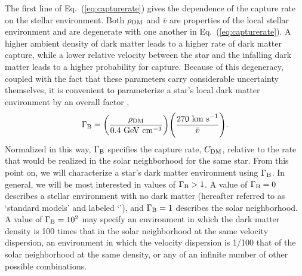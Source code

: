 \documentclass[useAMS,usenatbib]{mnras}
\providecommand{\DIFdelbegin}{} %
\providecommand{\DIFdelend}{} %
\newcommand{\DIFscaledelfig}{0.5}
\newlength{\DIFdelgraphicswidth} %
\newlength{\DIFdelgraphicsheight} %
\newcommand{\DIFdelincludegraphics}[2][]{%
\sbox{\DIFdelgraphicsbox}{\DIFOincludegraphics[#1]{#2}}%
\settoboxwidth{\DIFdelgraphicswidth}{\DIFdelgraphicsbox} %
\settoboxtotalheight{\DIFdelgraphicsheight}{\DIFdelgraphicsbox} %
\scalebox{\DIFscaledelfig}{%
\parbox[b]{\DIFdelgraphicswidth}{\usebox{\DIFdelgraphicsbox}\\[-\baselineskip] \rule{\DIFdelgraphicswidth}{0em}}\llap{\resizebox{\DIFdelgraphicswidth}{\DIFdelgraphicsheight}{%
\setlength{\unitlength}{\DIFdelgraphicswidth}%
\begin{picture}(1,1)%
\thicklines\linethickness{2pt} %
{\color[rgb]{1,0,0}\put(0,0){\framebox(1,1){}}}%
{\color[rgb]{1,0,0}\put(0,0){\line( 1,1){1}}}%
{\color[rgb]{1,0,0}\put(0,1){\line(1,-1){1}}}%
\end{picture}%
}\hspace*{3pt}}} %
} %
\DeclareRobustCommand{\DIFdelbegin}{\DIFOdelbegin \let\includegraphics\DIFdelincludegraphics} %
\DeclareRobustCommand{\DIFdelend}{\DIFOaddend \let\includegraphics\DIFOincludegraphics} %
\begin{document}
  The first line of Eq.~(\ref{eq:capturerate}) gives 
  the dependence of the capture rate on the stellar environment. 
  Both $\rho_{\mathrm{DM}}$ and $\bar{v}$ are properties of the local stellar environment 
  and are degenerate with one another in Eq.~(\ref{eq:capturerate}). 
  A higher ambient density of dark matter leads to a higher rate of dark matter capture, 
  while a lower relative velocity between the star and the infalling dark matter leads 
  to a higher probability for capture. 
  Because of this degeneracy, coupled with the fact that these parameters carry 
  considerable uncertainty themselves, 
  it is convenient to parameterize a star's 
  local dark matter environment by an overall 
  factor \citep{Zentner2011AsymmetricDwarfs,Hurst2015},
%
  \begin{equation}
  \Gamma_\mathrm{B} = \bigg(\frac{\rho_{\mathrm{DM}}}{0.4 \ \mathrm{GeV} \ \mathrm{cm}^{-3}}\bigg) \Bigg(\frac{270 \ \mathrm{km\ s}^{-1}}{\bar{v}}\Bigg).
  \label{eq:gammab}
  \end{equation}
%
\DIFdelbegin %
\DIFdelend %
Normalized in this way, $\Gamma_\mathrm{B}$ specifies the capture rate, 
$C_{\mathrm{DM}}$, relative to the rate that would be realized in the 
solar neighborhood for the same star. 
From this point on, 
we will characterize a star's dark matter environment using 
$\Gamma_\mathrm{B}$. In general, we will be most interested in values of $\Gamma_\mathrm{B} > 1$. 
A value of $\Gamma_\mathrm{B} = 0$ describes a stellar environment with no dark matter 
(hereafter referred to as `standard models' and labeled `\nodm'), 
and $\Gamma_\mathrm{B} = 1$ describes the solar neighborhood. 
A value of $\Gamma_\mathrm{B} = 10^{2}$ may specify an environment in 
which the dark matter density is 100 times that in the 
solar neighborhood at the same velocity dispersion, 
an environment in which the velocity dispersion is 1/100 that 
of the solar neighborhood at the same density, 
or any of an infinite number of other possible combinations. 
\end{document}
